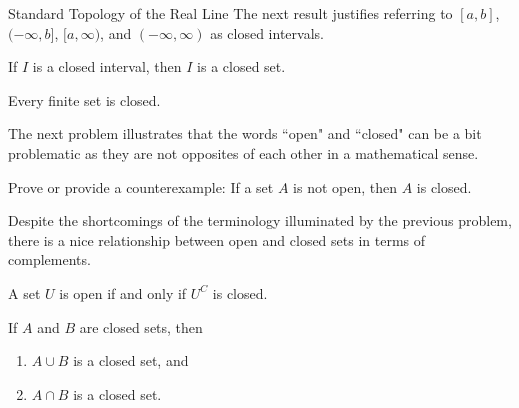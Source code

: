 \begin{section}{Standard Topology of the Real Line}
The next result justifies referring to $[a,b]$, $(-\infty,b]$, $[a,\infty)$, and $(-\infty,\infty)$ as closed intervals.

\begin{theorem}
If $I$ is a closed interval, then $I$ is a closed set.
\end{theorem}


\begin{theorem}
Every finite set is closed.
\end{theorem}

The next problem illustrates that the words ``open" and ``closed" can be a bit problematic as they are not opposites of each other in a mathematical sense.

\begin{problem}\label{prob:open and closed not opposites}
Prove or provide a counterexample: If a set $A$ is not open, then $A$ is closed.
\end{problem}

Despite the shortcomings of the terminology illuminated by the previous problem, there is a nice relationship between open and closed sets in terms of complements.

\begin{theorem}
A set $U$ is open if and only if $U^C$ is closed.
\end{theorem}

%



\begin{theorem}\label{thm:finite union and intersection of closed sets}
If $A$ and $B$ are closed sets, then 
\begin{enumerate}[label=\textrm{(\alph*)}]
\item $A\cup B$ is a closed set, and
\item $A\cap B$ is a closed set.
\end{enumerate}
\end{theorem}


\end{section}
